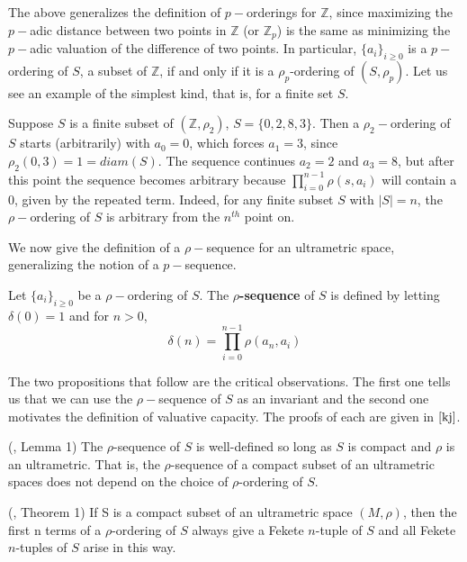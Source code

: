 The above generalizes the definition of $p-$orderings for $\mathbb{Z}$, since maximizing the $p-$adic distance between two points in $\mathbb{Z}$ (or $\mathbb{Z}_p$) is the same as minimizing the $p-$adic valuation of the difference of two points. In particular, $\{a_i\}_{i \geq 0}$ is a $p-$ordering of $S$, a subset of $\mathbb{Z}$, if and only if it is a $\rho_p$-ordering of $(S, \rho_p)$. Let us see an example of the simplest kind, that is, for a finite set $S$.

\begin{example}
Suppose $S$ is a finite subset of $(\mathbb{Z}, \rho_2)$, $S=\{0,2,8,3\}$. Then a $\rho_2-$ordering of $S$ starts (arbitrarily) with $a_0=0$, which forces $a_1=3$, since $\rho_2(0,3)=1=diam(S)$. The sequence continues $a_2=2$ and $a_3=8$, but after this point the sequence becomes arbitrary because  $\prod_{i=0}^{n-1} \rho(s,a_i)$ will contain a $0$, given by the repeated term. Indeed, for any finite subset $S$ with $\lvert S \rvert = n$, the $\rho-$ordering of $S$ is arbitrary from the $n^{th}$ point on. 
\end{example}

We now give the definition of a $\rho-$sequence for an ultrametric space, generalizing the notion of a $p-$sequence.

\begin{definition}
	\cite{kj} Let $\{a_i\}_{i \geq 0}$ be a $\rho-$ordering of $S$. The \textbf{$\rho$-sequence} of $S$ is defined by letting $\delta(0)=1$  and for $n > 0$, \[\delta(n)=\prod_{i=0}^{n-1} \rho(a_n,a_i)\]
\end{definition}

The two propositions that follow are the critical observations. The first one tells us that we can use the $\rho-$sequence of $S$ as an invariant and the second one motivates the definition of valuative capacity. The proofs of each are given in $\cite{kj}$.

\begin{proposition}
	(\cite{kj}, Lemma 1) The $\rho$-sequence of $S$ is well-defined so long as $S$ is compact and $\rho$ is an ultrametric. That is, the $\rho$-sequence of a compact subset of an ultrametric spaces does not depend on the choice of $\rho$-ordering of $S$.
\end{proposition}

\begin{proposition} (\cite{kj}, Theorem 1)
If S is a compact subset of an ultrametric space $(M, \rho)$, then the first n terms of a $\rho$-ordering of $S$ always give a Fekete $n$-tuple of $S$ and all Fekete $n$-tuples of $S$ arise in this way.
\end{proposition}

